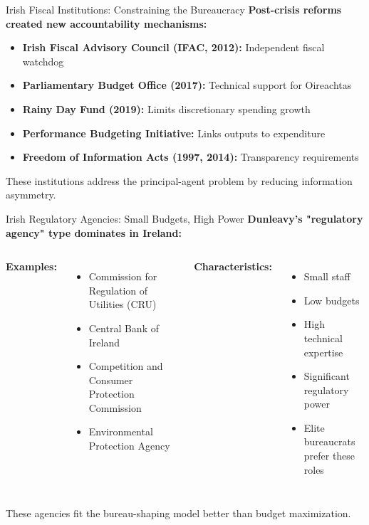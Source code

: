 \documentclass[10pt]{beamer}
\begin{document}
\begin{frame}{Irish Fiscal Institutions: Constraining the Bureaucracy}
\textbf{Post-crisis reforms created new accountability mechanisms:}

\begin{itemize}
\item \textbf{Irish Fiscal Advisory Council (IFAC, 2012):} Independent fiscal watchdog
\item \textbf{Parliamentary Budget Office (2017):} Technical support for Oireachtas
\item \textbf{Rainy Day Fund (2019):} Limits discretionary spending growth
\item \textbf{Performance Budgeting Initiative:} Links outputs to expenditure
\item \textbf{Freedom of Information Acts (1997, 2014):} Transparency requirements
\end{itemize}


\alert{These institutions address the principal-agent problem by reducing information asymmetry.}
\end{frame}

\begin{frame}{Irish Regulatory Agencies: Small Budgets, High Power}
\textbf{Dunleavy's "regulatory agency" type dominates in Ireland:}

\begin{columns}
\textbf{Examples:}
\begin{itemize}
\item Commission for Regulation of Utilities (CRU)
\item Central Bank of Ireland
\item Competition and Consumer Protection Commission
\item Environmental Protection Agency
\end{itemize}

\textbf{Characteristics:}
\begin{itemize}
\item Small staff
\item Low budgets
\item High technical expertise
\item Significant regulatory power
\item Elite bureaucrats prefer these roles
\end{itemize}
\end{columns}


\footnotesize
\alert{These agencies fit the bureau-shaping model better than budget maximization.}
\end{frame}
\end{document}
